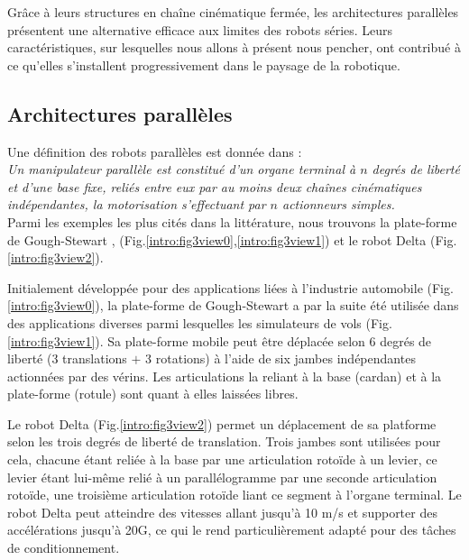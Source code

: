 Grâce à leurs structures en cha\^ine cin\'ematique ferm\'ee, les 
architectures parallèles pr\'esentent une alternative efficace aux limites des 
robots s\'eries.  Leurs caractéristiques, sur lesquel\-les nous allons \`a 
pr\'esent nous pencher, ont contribué à ce qu'elles s'installent 
progressivement 
dans le paysage de la robotique.

\subsection{Architectures parallèles} \label{chap0-0-2}



Une définition des robots parallèles est donnée dans \cite{merlet1997robots} :\\
{\it Un manipulateur parallèle est constitué d’un organe terminal à $n$ degrés 
de li\-berté et d’une base fixe, reliés entre eux par au moins deux chaînes
cinématiques indépendantes, la motorisation s’effectuant par $n$ actionneurs 
simples.}\\

Parmi les exemples les plus cités dans la littérature, nous trouvons 
la plate-forme de Gough-Stewart \cite{1956:Gough}, \cite{1965:Stewart} 
(Fig.\ref{intro:fig3view0},\ref{intro:fig3view1}) et le robot Delta 
\cite{1988:Clavel} (Fig.\ref{intro:fig3view2}).

Initialement développée pour des applications li\'ees \`a l'industrie 
automobile (Fig.\ref{intro:fig3view0}), la plate-forme de Gough-Stewart a par 
la suite été utilisée dans des applications diverses parmi lesquelles les 
simulateurs de vols (Fig.\ref{intro:fig3view1}). Sa plate-forme mobile peut 
être déplacée selon 6 degrés de liberté (3 translations $+$ 3 rotations) à 
l'aide de six jambes indépendantes actionnées par des vérins. Les 
articulations la reliant à la base (cardan) et à la plate-forme (rotule) sont 
quant à elles laissées libres.

Le robot Delta (Fig.\ref{intro:fig3view2}) permet un déplacement de sa 
platforme selon les trois degrés de liberté de translation. Trois jambes sont 
utilisées pour cela, chacune étant reliée à la base par une articulation rotoïde 
à un levier, ce levier étant lui-même relié à un parallélogramme par une 
seconde articulation rotoïde, une troisième articulation rotoïde liant ce 
segment à l'organe terminal. Le robot Delta peut atteindre des vitesses allant 
jusqu'à 10 m/s et supporter des accélérations jusqu'à 20G, ce qui le rend 
particulièrement adapté pour des tâches de conditionnement.

